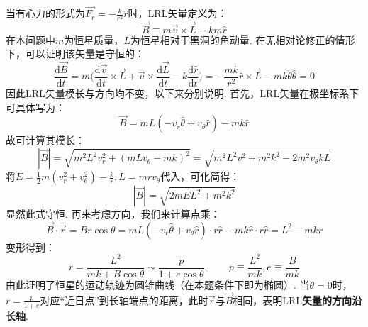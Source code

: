 \documentclass{ctexart}
\begin{document}
\noindent 当有心力的形式为$\displaystyle \vec{F_r}=-\frac{k}{r^2}\hat{r}$时，LRL矢量定义为：
\begin{equation}
\vec{B}\equiv m\vec{v}\times\vec{L}-km\hat{r} \tag{7.8}
\end{equation}
在本问题中$m$为恒星质量，$L$为恒星相对于黑洞的角动量. 在无相对论修正的情形下，可以证明该矢量是守恒的：
\begin{equation}
  \frac{\mathrm{d}\vec{B}}{\mathrm{d}t}=m\Big(\frac{\mathrm{d}\vec{v}}{\mathrm{d}t}\times \vec{L}+\vec{v} \times \frac{\mathrm{d}\vec{L}}{\mathrm{d}t}-k\frac{\mathrm{d}\hat{r}}{\mathrm{d}t}\Big)=-\frac{mk}{r^2}\hat{r} \times \vec{L}-mk\dot{\theta}\hat{\theta}=0 \tag{7.9}
\end{equation}
因此LRL矢量模长与方向均不变，以下来分别说明. 首先，LRL矢量在极坐标系下可具体写为：
\begin{equation}
  \vec{B}=mL(-v_r\hat{\theta}+v_{\theta}\hat{r})-mk\hat{r}\tag{7.10}
\end{equation}
故可计算其模长：
\begin{equation}
  |\vec{B}|=\sqrt{m^2L^2v_r^2+(mLv_\theta-mk)^2}=\sqrt{m^2L^2v^2+m^2k^2-2m^2v_{\theta}kL}\tag{7.11}
\end{equation}
将$\displaystyle E=\frac{1}{2}m(v_r^2+v_{\theta}^2)-\frac{k}{r},L=mrv_{\theta}$代入，可化简得：
\begin{equation}
  |\vec{B}|=\sqrt{2mEL^2+m^2k^2} \tag{7.12}
\end{equation}
显然此式守恒. 再来考虑方向，我们来计算点乘：
\begin{equation}
  \vec{B}\cdot \vec{r}=Br\cos{\theta}=mL(-v_r\hat{\theta}+v_{\theta}\hat{r})\cdot r\hat{r}-mk\hat{r}\cdot r\hat{r}=L^2-mkr \tag{7.13}
\end{equation}
变形得到：
\begin{equation}
  r=\frac{L^2}{mk+B\cos{\theta}}\sim \frac{p}{1+e\cos{\theta}},\qquad p\equiv\frac{L^2}{mk},e\equiv \frac{B}{mk}\tag{7.14}
\end{equation}
由此证明了恒星的运动轨迹为圆锥曲线（在本题条件下即为椭圆）. 当$\theta=0$时，$\displaystyle r=\frac{p}{1+e}$对应“近日点”到长轴端点的距离，此时$\vec{r}$与$\vec{B}$相同，表明\textbf{$\mathrm{LRL}$矢量的方向沿长轴}.
\end{document}
